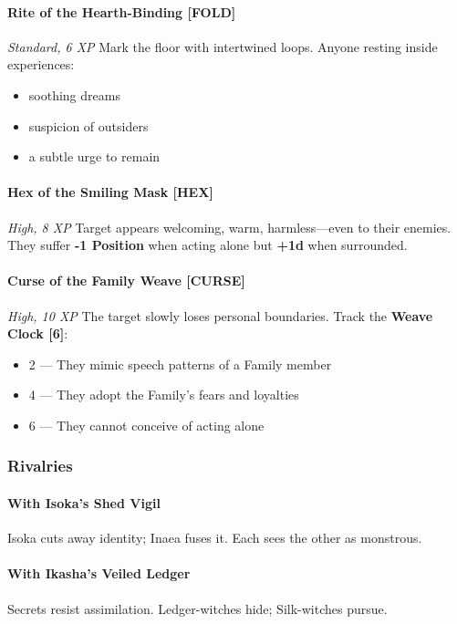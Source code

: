 \documentclass[11pt]{book}
\begin{document}
\paragraph{Rite of the Hearth-Binding [FOLD]}
\emph{Standard, 6 XP}  
Mark the floor with intertwined loops.  
Anyone resting inside experiences:
\begin{itemize}[leftmargin=*]
    \item soothing dreams  
    \item suspicion of outsiders  
    \item a subtle urge to remain  
\end{itemize}

\paragraph{Hex of the Smiling Mask [HEX]}
\emph{High, 8 XP}  
Target appears welcoming, warm, harmless---even to their enemies.  
They suffer \textbf{-1 Position} when acting alone but \textbf{+1d} when surrounded.

\paragraph{Curse of the Family Weave [CURSE]}
\emph{High, 10 XP}  
The target slowly loses personal boundaries.  
Track the \textbf{Weave Clock [6]}:
\begin{itemize}[leftmargin=*]
    \item 2 --- They mimic speech patterns of a Family member  
    \item 4 --- They adopt the Family's fears and loyalties  
    \item 6 --- They cannot conceive of acting alone  
\end{itemize}

\subsubsection{Rivalries}

\paragraph{With Isoka's Shed Vigil}
Isoka cuts away identity; Inaea fuses it.  
Each sees the other as monstrous.

\paragraph{With Ikasha's Veiled Ledger}
Secrets resist assimilation.  
Ledger-witches hide; Silk-witches pursue.
\end{document}
